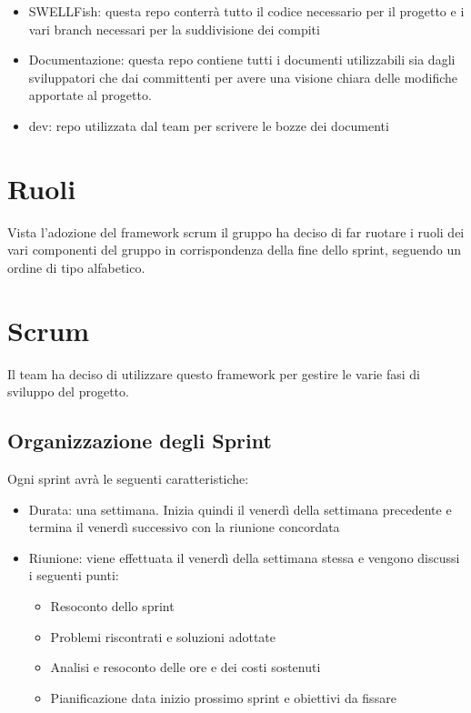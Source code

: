 \documentclass[12pt]{article}
\begin{document}
\begin{itemize}
    \item SWELLFish: questa repo conterrà tutto il codice necessario per il progetto e i vari branch necessari per la suddivisione dei compiti
    \item Documentazione: questa repo contiene tutti i documenti utilizzabili sia dagli sviluppatori che dai committenti per avere una visione chiara delle modifiche apportate al progetto.
    \item dev: repo utilizzata dal team per scrivere le bozze dei documenti
\end{itemize}
\section{Ruoli}
Vista l'adozione del framework scrum il gruppo ha deciso di far ruotare i ruoli dei vari componenti del gruppo in corrispondenza della fine dello sprint, seguendo un ordine di tipo alfabetico.
\section{Scrum}
Il team ha deciso di utilizzare questo framework per gestire le varie fasi di sviluppo del progetto.
\subsection{Organizzazione degli Sprint}
Ogni sprint avrà le seguenti caratteristiche:
\begin{itemize}
    \item Durata: una settimana. Inizia quindi il venerdì della settimana precedente e termina il venerdì successivo con la riunione concordata
    \item Riunione: viene effettuata il venerdì della settimana stessa e vengono discussi i seguenti punti:
    \begin{itemize}
        \item Resoconto dello sprint
        \item Problemi riscontrati e soluzioni adottate
        \item Analisi e resoconto delle ore e dei costi sostenuti
        \item Pianificazione data inizio prossimo sprint e obiettivi da fissare
    \end{itemize}
    
\end{itemize}
\end{document}

